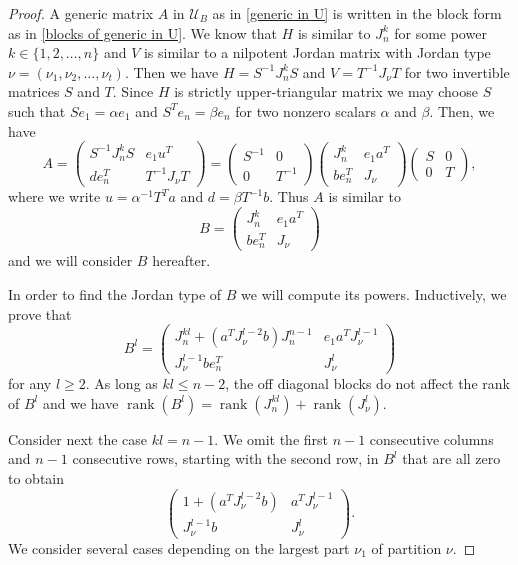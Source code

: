 \documentclass[11pt]{amsproc}
\newcommand{\U}{\mathcal{U}}
\DeclareMathOperator{\rank}{rank}
\begin{document}
\begin{proof}
A generic matrix $A$ in $\U_B$ as in \eqref{generic in U} is written in the block form as in \eqref{blocks of generic in U}. We know that $H$ is similar to $J_n^k$ for some power $k\in\{1,2,\ldots,n\} $ and $V$ is similar to a nilpotent Jordan matrix with Jordan type $\nu=(\nu_1,\nu_2,\ldots,\nu_t)$. Then we have $H=S^{-1} J_n^k S $ and $V=T^{-1}J_{\nu}T $ for two invertible matrices $S$ and $T$. Since $H$ is strictly upper-triangular matrix we may choose $S$ such that $Se_1=\alpha e_1$ and $S^Te_n=\beta e_n$ for two nonzero scalars $\alpha$ and $\beta$. Then, we have
$$
A=\left( 
\begin{array}{c|c}
  S^{-1} J_n^kS   & e_1 u^T \\
  \hline
  d e_n^T   & T^{-1}J_{\nu}T
\end{array}
\right)=\left( 
\begin{array}{c|c}
  S^{-1}   & 0 \\
\hline
0   & T^{-1}
\end{array}
\right)\left( 
\begin{array}{c|c}
  J_n^k   & e_1 a^T \\
  \hline
  b e_n^T   & J_{\nu}
\end{array}
\right)\left( 
\begin{array}{c|c}
  S   & 0 \\
  \hline
  0   & T
\end{array}
\right),
$$
where we write $u=\alpha^{-1}T^Ta $ and $d=\beta T^{-1}b $.
Thus $A$ is similar to 
\[B=\left( 
\begin{array}{c|c}
  J_n^k   & e_1 a^T \\
  \hline
  b e_n^T   & J_{\nu}
\end{array}
\right)\]
and we will consider $B$ hereafter.

In order to find the Jordan type of $B$ we will compute its powers. Inductively, we prove that
$$
B^l=\left( 
\begin{array}{c|c}
  J_n^{kl} + \left(a^TJ_{\nu}^{l-2}b\right) J_n^{n-1}   & e_1 a^T J_{\nu}^{l-1} \\
  \hline
   J_{\nu}^{l-1} b e^T_n  & J_{\nu}^l
\end{array}
\right)
$$
for any $l\ge 2$. As long as $kl\leq n-2$, the off diagonal blocks do not affect the rank of $B^l$ and we have $\rank(B^l)=\rank(J_n^{kl})+\rank(J_{\nu}^l )$.

Consider next the case $kl=n-1$. We omit the first $n-1$ consecutive columns and $n-1$ consecutive rows, starting with the second row, in $B^l$ that are all zero to obtain
\begin{equation}
\label{kl=n-1}
\left( 
\begin{array}{c|c}
  1 + \left(a^TJ_{\nu}^{l-2}b\right)    & a^T J_{\nu}^{l-1} \\
  \hline
   J_{\nu}^{l-1} b   & J_{\nu}^l
\end{array}
\right).
\end{equation}
We consider several cases depending on the largest part $\nu_1$ of partition $\nu$. 


\end{proof}
\end{document}
